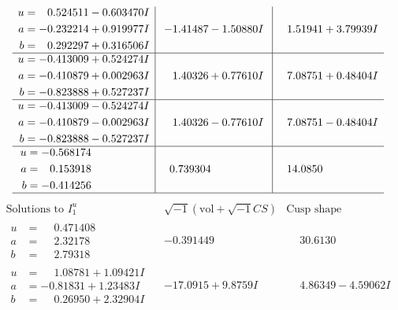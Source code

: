 \documentclass[1p]{elsarticle_modified}
\theoremstyle{definition}
\newcommand{\I}{\sqrt{-1}}
\begin{document}
$$\begin{array}{c|c|c}
\begin{aligned}
u &= \phantom{-}0.524511 - 0.603470 I \\
a &= -0.232214 + 0.919977 I \\
b &= \phantom{-}0.292297 + 0.316506 I\end{aligned}
 & -1.41487 - 1.50880 I & \phantom{-}1.51941 + 3.79939 I \\ \hline\begin{aligned}
u &= -0.413009 + 0.524274 I \\
a &= -0.410879 + 0.002963 I \\
b &= -0.823888 + 0.527237 I\end{aligned}
 & \phantom{-}1.40326 + 0.77610 I & \phantom{-}7.08751 + 0.48404 I \\ \hline\begin{aligned}
u &= -0.413009 - 0.524274 I \\
a &= -0.410879 - 0.002963 I \\
b &= -0.823888 - 0.527237 I\end{aligned}
 & \phantom{-}1.40326 - 0.77610 I & \phantom{-}7.08751 - 0.48404 I \\ \hline\begin{aligned}
u &= -0.568174\phantom{ +0.000000I} \\
a &= \phantom{-}0.153918\phantom{ +0.000000I} \\
b &= -0.414256\phantom{ +0.000000I}\end{aligned}
 & \phantom{-}0.739304\phantom{ +0.000000I} & \phantom{-}14.0850\phantom{ +0.000000I}\\
 \hline 
 \end{array}$$\newpage$$\begin{array}{c|c|c}  
\text{Solutions to }I^u_{1}& \I (\text{vol} + \sqrt{-1}CS) & \text{Cusp shape}\\
 \hline 
\begin{aligned}
u &= \phantom{-}0.471408\phantom{ +0.000000I} \\
a &= \phantom{-}2.32178\phantom{ +0.000000I} \\
b &= \phantom{-}2.79318\phantom{ +0.000000I}\end{aligned}
 & -0.391449\phantom{ +0.000000I} & \phantom{-}30.6130\phantom{ +0.000000I} \\ \hline\begin{aligned}
u &= \phantom{-}1.08781 + 1.09421 I \\
a &= -0.81831 + 1.23483 I \\
b &= \phantom{-}0.26950 + 2.32904 I\end{aligned}
 & -17.0915 + 9.8759 I & \phantom{-}4.86349 - 4.59062 I \\ \hline\begin{aligned}

\end{aligned}
\end{array}$$
\end{document}

